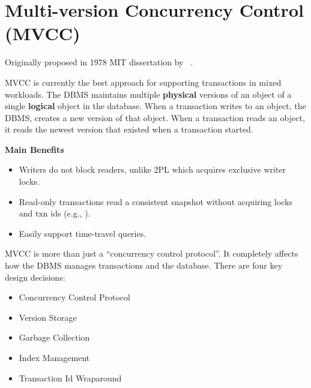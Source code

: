 \documentclass[11pt]{article}
\begin{document}
\maketitle
\thispagestyle{plain}

\section{Multi-version Concurrency Control (MVCC)}
Originally proposed in 1978 MIT dissertation by \citeauthor{reed1978naming}~\cite{reed1978naming}.

MVCC is currently the best approach for supporting transactions in mixed workloads.
The DBMS maintains multiple \textbf{physical} versions of an object of a single 
\textbf{logical} object in the database. 
When a transaction writes to an object, the DBMS, creates a new version of that object.
When a transaction reads an object, it reads the newest version that existed when a 
transaction started.
    
\textbf{Main Benefits}
\begin{itemize}
    \item
    Writers do not block readers, unlike 2PL which acquires exclusive writer locks.
    
    \item
    Read-only transactions read a consistent snapshot without acquiring locks and txn ids 
    (e.g., ).
    
    \item
    Easily support time-travel queries.
    
\end{itemize}

MVCC is more than just a ``concurrency control protocol''. It completely affects how the 
DBMS manages transactions and the database. There are four key design decisions:~\cite{p781-wu}
\begin{itemize}
    \item Concurrency Control Protocol
    \item Version Storage
    \item Garbage Collection
    \item Index Management
    \item Transaction Id Wraparound
\end{itemize}
\end{document}
